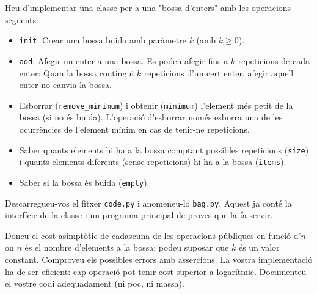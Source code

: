 

\Statement

Heu d'implementar una classe per a una "bossa d'enters" amb les operacions següents:

\begin{itemize}

\item \texttt{init}: Crear una bossa buida amb paràmetre $k$ (amb $k\ge0$).

\item \texttt{add}: Afegir un enter a una bossa. Es poden afegir fins a $k$ repeticions de cada enter: Quan la bossa contingui $k$ repeticions d'un cert enter, afegir aquell enter no canvia la bossa.

\item Esborrar (\texttt{remove\_minimum}) i obtenir (\texttt{minimum}) l'element més petit de la bossa (si no és buida). L'operació d'esborrar només esborra una de les ocurrències de l'element mínim en cas de tenir-ne repeticions.

\item Saber quants elements hi ha a la bossa comptant possibles repeticions (\texttt{size}) i quants elements diferents (sense repeticions) hi ha a la bossa (\texttt{items}).

\item Saber si la bossa és buida (\texttt{empty}).

\end{itemize}

\medskip

Descarregueu-vos el fitxer \texttt{code.py} i anomeneu-lo \texttt{bag.py}. Aquest ja conté la interfície de la classe i un programa principal de proves que la fa servir.

\bigskip

Doneu el cost asimptòtic de cadascuna de les operacions públiques en funció d'$n$ on $n$ és el nombre d'elements a la bossa; podeu suposar que $k$ és un valor constant. Comproveu els possibles errors amb assercions. La vostra implementació ha de ser eficient: cap operació pot tenir cost superior a logarítmic. Documenteu el vostre codi adequadament (ni poc, ni massa).

\SampleOneCol

